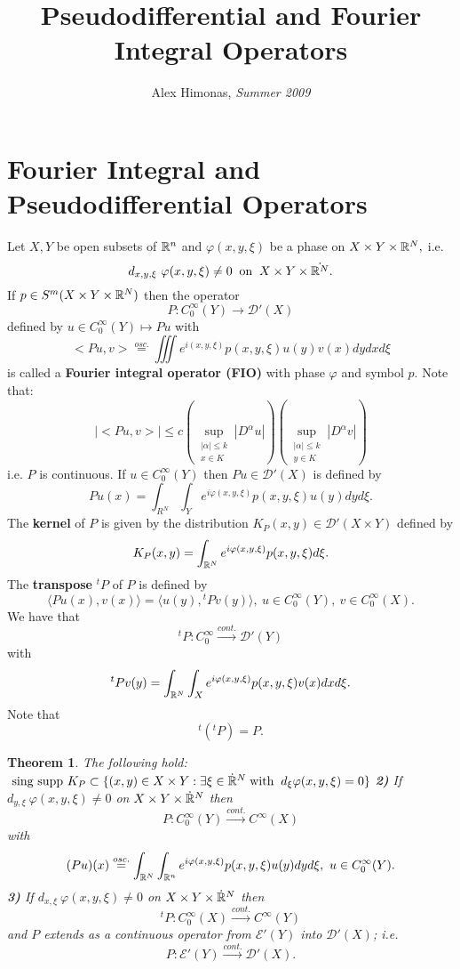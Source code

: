 \documentclass[12pt,reqno]{amsart}
\theoremstyle{plain}  %
\newtheorem{theorem}{Theorem}
\theoremstyle{definition}
\newcommand{\nin}{\noindent}
\newcommand{\vph}{\varphi}
\begin{document}
\title{Pseudodifferential and Fourier Integral Operators}
\author{Alex Himonas, {\it Summer 2009}}
\maketitle
\setcounter{section}{2}
\section{Fourier Integral and Pseudodifferential Operators}
\nin
Let $X, Y$ be open subsets of $\Bbb R^n$ and $\varphi (x,y, \xi)$ be a phase on $X
\times Y \times \Bbb R^N, $
i.e.
$$d_{x, y, \xi}\  \varphi(x,y, \xi) \ne 0 \; \; \text{on} \; \; X \times Y \times
\dot{\Bbb R^N}.$$ 
If $ p\in S^m(X \times Y \times \Bbb R^N)$ then the operator
$$P : C^\infty_0 (Y) \longrightarrow \mathcal D'(X)$$
defined by $u \in C^\infty_0 (Y) \longmapsto Pu$ with
$$<Pu,v> \overset{osc.}{=} \iiint e^{i(x,y,\xi)} p(x,y,\xi)u(y)
v(x)dydxd \xi$$ 
is called a {\bf Fourier integral operator (FIO)} with phase $\vph$ and symbol $p$.
\medskip
\nin
Note that:
$$|<Pu,v> |\le c (\sup_{\substack{|\alpha| \le k \\ x \in K}} |D^\alpha u|)
(\sup_{\substack{|\alpha| \le k\\ y\in K}} |D^\alpha v|)$$
i.e. $P$ is continuous.
\medskip
\nin
If $u \in C^\infty_0 (Y)$ then $Pu \in \mathcal D'(X)$ is defined by
$$Pu(x) = \int_{R^N} \int_Y e^{i\vph(x,y,\xi)} p(x,y,\xi) u(y)dyd\xi.$$
The {\bf kernel} of $P$ is given by the distribution $K_P(x,y) \in \mathcal D'(X \times
Y)$ defined by 
$$K_P(x,y)= \int_{\Bbb R^N}e^{i\vph(x,y,\xi)}p(x,y,\xi)d\xi.$$
The {\bf transpose}  ${}^tP$ of $P$ is defined by
$$\langle Pu(x),v(x)\rangle = \langle u(y),{}^tP v(y)\rangle,\ u\in
C^\infty_0(Y),\ v\in C^\infty_0(X).$$
We have that
$${}^tP:C^\infty_0 \xrightarrow{cont.} \mathcal D'(Y)$$
with 
$${}^tPv(y) = \int_{\Bbb R^N} \int_Xe^{i\vph(x,y,\xi)}p(x,y,\xi)v(x)dxd\xi.$$
Note that
$${}^t({}^tP)=P.$$
\begin{theorem}
The following hold:
\vskip0.1in
\nin {\bf 1)} $\text{ sing supp } K_P \subset\{(x,y) \in X \times Y:
\exists \xi \in \dot{\Bbb R}^N \; \text{with} \;\; d_\xi \vph(x,y,\xi) = 0\}$
\vskip0.1in
\nin
{\bf 2)} If $d_{y,\xi} \ \vph(x,y,\xi) \ne 0$ on $X\times Y \times
\dot{\Bbb R}^N$ then $$P:C^\infty_0 (Y) \xrightarrow{cont.} C^\infty(X)$$
with
$$(Pu)(x) \overset{osc.}{=} \int_{\Bbb R^N} \int_{\Bbb R^n} e^{i\vph
(x,y,\xi)} p(x,y,\xi)u(y)dyd\xi,\  u \in C^\infty_0(Y).$$    
\smallskip
\nin
{\bf 3)}  If $d_{x,\xi}\ \vph(x,y,\xi)\ne 0$ on $X \times Y \times
\dot{\Bbb R}^N$ then
$${}^tP:C^\infty_0(X) \xrightarrow{cont.} C^\infty(Y)$$
and $P$ extends as a continuous operator from $\mathcal E'(Y)$ into $\mathcal D'(X)$; i.e.
$$P:  \mathcal E' (Y) \xrightarrow{cont.}  \mathcal D'(X).$$
\end{theorem}
\end{document}
